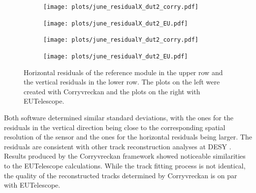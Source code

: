 \begin{figure}[H]
  \hspace{-0.4cm}
  \begin{subfigure}{0.51\textwidth}
      \texttt{[image: plots/june\_residualX\_dut2\_corry.pdf]}
  \end{subfigure}
  \begin{subfigure}{0.51\textwidth}
      \hspace{-0.19cm}
      \texttt{[image: plots/june\_residualX\_dut2\_EU.pdf]}
  \end{subfigure}
  \begin{subfigure}{0.51\textwidth}
    \hspace{-0.4cm}
      \texttt{[image: plots/june\_residualY\_dut2\_corry.pdf]}
  \end{subfigure}
  \begin{subfigure}{0.51\textwidth}
    \hspace{-0.4cm}
      \hspace{-0.19cm}
      \texttt{[image: plots/june\_residualY\_dut2\_EU.pdf]}
  \end{subfigure}
  \caption{Horizontal residuals of the reference module in the upper row and the vertical residuals in the lower row. The plots on the left
  were created with Corryvreckan and the plots on the right with EUTelescope.}
  \label{fig:residual_dut}
\end{figure}

Both software determined similar standard deviations,
with the ones for the residuals in the vertical direction being close to
the corresponding spatial resolution of the sensor and the ones for the horizontal residuals being larger. The residuals are consistent with other track reconstruction
analyses at DESY \cite{resolution}.\\
Results produced by the Corryvreckan framework showed noticeable similarities to the EUTelescope calculations. While the track
fitting process is not identical, the quality of the reconstructed tracks determined by Corryvreckan is on par with EUTelescope.
